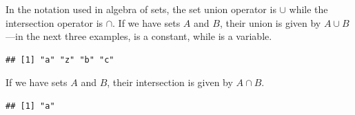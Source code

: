 \documentclass[krantz2]{krantz}\usepackage{knitr}
\begin{document}
In the notation used in algebra of sets, the set union operator is $\cup$ while the intersection operator is $\cap$. If we have sets $A$ and $B$, their union is given by $A \cup B$---in the next three examples,  is a constant, while  is a variable.

\begin{knitrout}\footnotesize
{}\color{fgcolor}\begin{kframe}
\begin{alltt}
\hlstd{(}\hlstd{(}\hlstd{,} \hlstd{,} 
\end{alltt}
\begin{verbatim}
## [1] "a" "z" "b" "c"
\end{verbatim}
\end{kframe}
\end{knitrout}

If we have sets $A$ and $B$, their intersection is given by $A \cap B$.

\begin{knitrout}\footnotesize
{}\color{fgcolor}\begin{kframe}
\begin{alltt}
\hlstd{(}\hlstd{(}\hlstd{,} \hlstd{,} 
\end{alltt}
\begin{verbatim}
## [1] "a"
\end{verbatim}
\end{kframe}
\end{knitrout}
\end{document}
